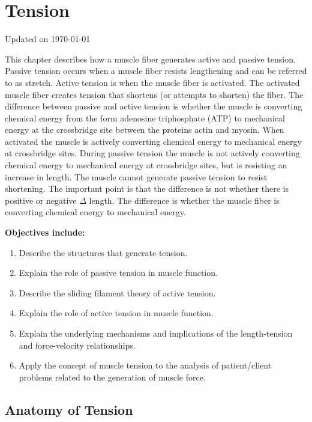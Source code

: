 \chapter{Tension}\label{chp:tension}
Updated on \today
\minitoc

This chapter describes how a muscle fiber generates active and passive tension. Passive tension occurs when a muscle fiber resists lengthening and can be referred to as stretch. Active tension is when the muscle fiber is activated. The activated muscle fiber creates tension that shortens (or attempts to shorten) the fiber.  The difference between passive and active tension is whether the muscle is converting chemical energy from the form adenosine triphosphate (ATP) to mechanical energy at the crossbridge site between the proteins actin and myosin. When activated the muscle is actively converting chemical energy to mechanical energy at crossbridge sites. During passive tension the muscle is not actively converting chemical energy to mechanical energy at crossbridge sites, but is resisting an increase in length. The muscle cannot generate passive tension to resist shortening. The important point is that the difference is not whether there is positive or negative $\Delta$ length. The difference is whether the muscle fiber is converting chemical energy to mechanical energy.

\vspace{5mm}
\begin{svgraybox}
\textbf{Objectives include:}
\begin{enumerate}
    \item Describe the structures that generate tension.
    \item Explain the role of passive tension in muscle function.
    \item Describe the sliding filament theory of active tension.
    \item Explain the role of active tension in muscle function.
    \item Explain the underlying mechanisms and implications of the length-tension and force-velocity relationships.
   \item Apply the concept of muscle tension to the analysis of patient/client problems related to the generation of muscle force.
\end{enumerate}
\end{svgraybox}

\section{Anatomy of Tension}

